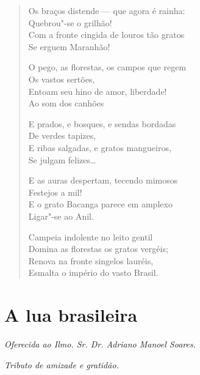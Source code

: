 \begin{verse}
Os braços distende --- que agora é rainha:\\
Quebrou"-se o grilhão!\\
Com a fronte cingida de louros tão gratos\\
Se erguem Maranhão!

O pego, as florestas, os campos que regem\\
Os vastos sertões,\\
Entoam seu hino de amor, liberdade!\\
Ao som dos canhões

E prados, e bosques, e sendas bordadas\\
De verdes tapizes,\\
E ribas salgadas, e gratos mangueiros,\\
Se julgam felizes\ldots{}

E as auras despertam, tecendo mimosos\\
Festejos a mil!\\
E o grato Bacanga parece em amplexo\\
Ligar"-se ao Anil.

Campeia indolente no leito gentil\\
Domina as florestas os gratos vergéis;\\
Renova na fronte singelos lauréis,\\
Esmalta o império do vasto Brasil.
\end{verse}

\chapter{A lua brasileira}

\hfill{}\emph{Oferecida ao Ilmo. Sr. Dr. Adriano Manoel Soares.}

\hfill{}\emph{Tributo de amizade e gratidão.}

\medskip

